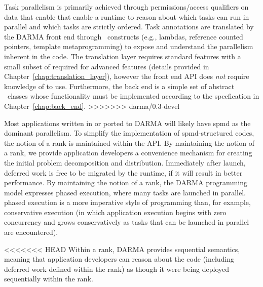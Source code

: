 Task parallelism is primarily achieved through permissions/access qualifiers
on data that enable that enable a runtime to reason about which tasks can run in parallel and which tasks are strictly ordered.
Task annotations are translated by the DARMA front end through \CC\ constructs (e.g., lambdas, reference counted pointers, template
metaprogramming) to expose and understand the parallelism inherent in the code.  
The \gls{translation layer} requires  standard features with a small subset of
 required for advanced features (details provided in Chapter~\ref{chap:translation_layer}), 
however the \gls{front end} \gls{API} does \emph{not} require knowledge of  to use. 
Furthermore, the \gls{back end} is a simple set of abstract \CC\ classes whose functionality must be implemented
according to the specfication in Chapter~\ref{chap:back_end}.
>>>>>>> darma/0.3-devel

Most applications written in or ported to \gls{DARMA} will likely have \gls{spmd} as the dominant parallelism.
To simplify the implementation of \gls{spmd}-structured codes, the notion of a \gls{rank} is maintained within the \gls{API}.   
By maintaining the notion of a \gls{rank}, we provide application developers a convenience mechanism for creating
the initial problem decomposition and distribution.  
Immediately after launch, \gls{deferred work} is free to be migrated by the runtime, if it will result in
better performance.
By maintaining the notion of a \gls{rank}, the \gls{DARMA} \gls{programming model} expresses \gls{phased execution},
where many tasks are launched in parallel.  \Gls{phased execution} is a more
\gls{imperative} style of programming than, for example, \gls{conservative execution} 
(in which application execution begins with zero \gls{concurrency}
and grows conservatively as tasks that can be launched in parallel are
encountered).

<<<<<<< HEAD
Within a \gls{rank}, \gls{DARMA} provides \gls{sequential semantics}, 
meaning that application developers can reason about the code (including
\gls{deferred work} defined within the \gls{rank}) as though it were being deployed sequentially within the \gls{rank}.   



